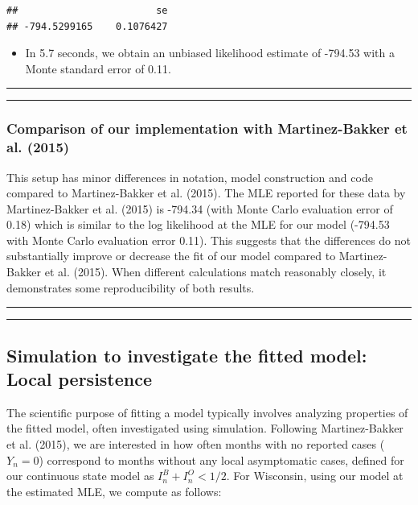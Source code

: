 \documentclass[]{article}
\providecommand{\tightlist}{%
  \setlength{\itemsep}{0pt}\setlength{\parskip}{0pt}}
\begin{document}
\begin{verbatim}
##                        se 
## -794.5299165    0.1076427
\end{verbatim}

\begin{itemize}
\tightlist
\item
  In 5.7 seconds, we obtain an unbiased likelihood estimate of -794.53
  with a Monte standard error of 0.11.
\end{itemize}

\begin{center}\rule{0.5\linewidth}{\linethickness}\end{center}

\begin{center}\rule{0.5\linewidth}{\linethickness}\end{center}

\subsubsection{Comparison of our implementation with Martinez-Bakker et
al.
(2015)}\label{comparison-of-our-implementation-with-martinez-bakker15}

This setup has minor differences in notation, model construction and
code compared to Martinez-Bakker et al. (2015). The MLE reported for
these data by Martinez-Bakker et al. (2015) is -794.34 (with Monte Carlo
evaluation error of 0.18) which is similar to the log likelihood at the
MLE for our model (-794.53 with Monte Carlo evaluation error 0.11). This
suggests that the differences do not substantially improve or decrease
the fit of our model compared to Martinez-Bakker et al. (2015). When
different calculations match reasonably closely, it demonstrates some
reproducibility of both results.

\begin{center}\rule{0.5\linewidth}{\linethickness}\end{center}

\begin{center}\rule{0.5\linewidth}{\linethickness}\end{center}

\subsection{Simulation to investigate the fitted model: Local
persistence}\label{simulation-to-investigate-the-fitted-model-local-persistence}

The scientific purpose of fitting a model typically involves analyzing
properties of the fitted model, often investigated using simulation.
Following Martinez-Bakker et al. (2015), we are interested in how often
months with no reported cases (\(Y_n=0\)) correspond to months without
any local asymptomatic cases, defined for our continuous state model as
\(I^B_n+I^O_n<1/2\). For Wisconsin, using our model at the estimated
MLE, we compute as follows:
\end{document}
